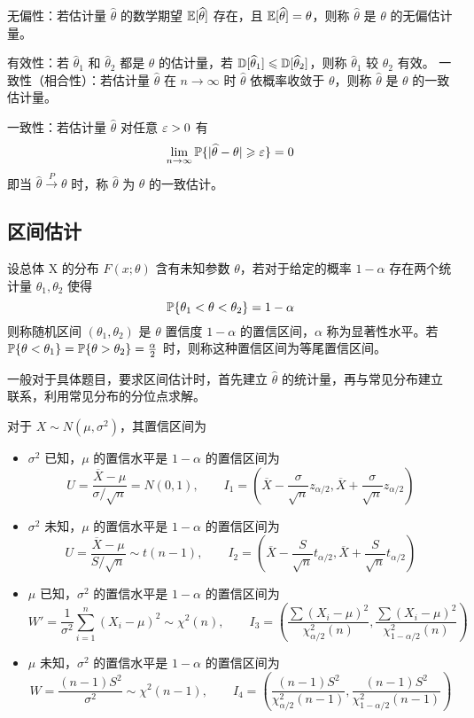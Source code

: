 无偏性：若估计量 $\widehat{\theta}$ 的数学期望 $\mathbb{E}[\widehat{\theta}]$ 存在，且 $\mathbb{E}[\widehat{\theta}] = \theta$，则称 $\widehat{\theta}$ 是 $\theta$ 的无偏估计量。

有效性：若 $\widehat{\theta}_1$ 和 $\widehat{\theta}_2$ 都是 $\theta$ 的估计量，若 $\mathbb{D}[\widehat{\theta}_1] \leqslant \mathbb{D}[\widehat{\theta}_2]$，则称 $\widehat{\theta}_1$ 较 $\widehat{\theta}_2$ 有效。
一致性（相合性）：若估计量 $\widehat{\theta}$ 在 $n \to \infty$ 时 $\widehat{\theta}$ 依概率收敛于 $\theta$，则称 $\widehat{\theta}$ 是 $\theta$ 的一致估计量。

一致性：若估计量 $\widehat{\theta}$ 对任意 $\varepsilon > 0$ 有
\[ \lim_{n \to \infty} \mathbb{P}\{|\widehat{\theta}-\theta| \geqslant \varepsilon\} = 0 \]
即当 $\widehat{\theta} \stackrel{P}{\longrightarrow} \theta$ 时，称 $\widehat{\theta}$ 为 $\theta$ 的一致估计。

\subsection{区间估计}

设总体 X 的分布 $F(x;\theta)$ 含有未知参数 $\theta$，若对于给定的概率 $1 - \alpha$ 存在两个统计量 $\theta_1, \theta_2$ 使得
\[ \mathbb{P}\{\theta_1 < \theta < \theta_2\} = 1-\alpha \]
则称随机区间 $(\theta_1, \theta_2)$ 是 $\theta$ 置信度 $1-\alpha$ 的置信区间，$\alpha$ 称为显著性水平。若 $\mathbb{P}\{\theta < \theta_1\} = \mathbb{P}\{\theta > \theta_2\} = \frac{\alpha}{2}$ 时，则称这种置信区间为等尾置信区间。

一般对于具体题目，要求区间估计时，首先建立 $\widehat{\theta}$ 的统计量，再与常见分布建立联系，利用常见分布的分位点求解。

对于 $X \sim N(\mu,\sigma^2)$，其置信区间为
\begin{itemize}
	\item $\sigma^2$ 已知，$\mu$ 的置信水平是 $1-\alpha$ 的置信区间为
	      \[ U = \frac{\overline{X} - \mu}{\sigma/\sqrt{n}} = N(0, 1), \qquad
		      I_1 = \left(\overline{X} - \frac{\sigma}{\sqrt{n}} z_{\alpha/2},\overline{X} + \frac{\sigma}{\sqrt{n}} z_{\alpha/2} \right) \]
	\item $\sigma^2$ 未知，$\mu$ 的置信水平是 $1-\alpha$ 的置信区间为
	      \[ U = \frac{\overline{X} - \mu}{S/\sqrt{n}} \sim t(n-1), \qquad
		      I_2 = \left(\overline{X} - \frac{S}{\sqrt{n}} t_{\alpha/2},\overline{X} + \frac{S}{\sqrt{n}} t_{\alpha/2} \right) \]
	\item $\mu$ 已知，$\sigma^2$ 的置信水平是 $1-\alpha$ 的置信区间为
	      \[ W' = \frac{1}{\sigma^2}\sum_{i=1}^n (X_i - \mu)^2\sim \chi^2(n), \qquad
		      I_3 = \left(\frac{\sum (X_i - \mu)^2}{\chi^2_{\alpha/2}(n)} , \frac{\sum (X_i - \mu)^2}{\chi^2_{1-\alpha/2}(n)} \right) \]
	\item $\mu$ 未知，$\sigma^2$ 的置信水平是 $1-\alpha$ 的置信区间为
	      \[ W = \frac{(n-1)S^2}{\sigma^2} \sim \chi^2(n-1), \qquad
		      I_4 = \left(\frac{(n-1)S^2}{\chi^2_{\alpha/2}(n-1)} , \frac{(n-1)S^2}{\chi^2_{1-\alpha/2}(n-1)} \right) \]
\end{itemize}

